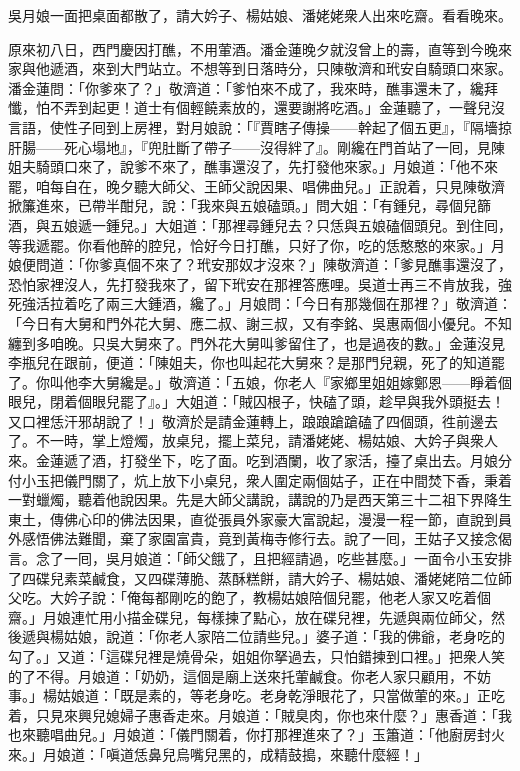 吳月娘一面把桌面都散了，請大妗子、楊姑娘、潘姥姥衆人出來吃齋。看看晚來。

原來初八日，西門慶因打醮，不用葷酒。潘金蓮晚夕就沒曾上的壽，直等到今晚來家與他遞酒，來到大門站立。不想等到日落時分，只陳敬濟和玳安自騎頭口來家。潘金蓮問：「你爹來了？」敬濟道：「爹怕來不成了，我來時，醮事還未了，纔拜懺，怕不弄到起更！道士有個輕饒素放的，還要謝將吃酒。」金蓮聽了，一聲兒沒言語，使性子囘到上房裡，對月娘說：「『賈瞎子傳操——幹起了個五更』，『隔墻掠肝腸——死心塌地』，『兜肚斷了帶子——沒得絆了』。{}剛纔在門首站了一囘，見陳姐夫騎頭口來了，說爹不來了，醮事還沒了，先打發他來家。」月娘道：「他不來罷，咱每自在，晚夕聽大師父、王師父說因果、唱佛曲兒。」{}正說着，只見陳敬濟掀簾進來，已帶半酣兒，說：「我來與五娘磕頭。」問大姐：「有鍾兒，尋個兒篩酒，與五娘遞一鍾兒。」大姐道：「那裡尋鍾兒去？只恁與五娘磕個頭兒。到住囘，等我遞罷。你看他醉的腔兒，恰好今日打醮，只好了你，吃的恁憨憨的來家。」月娘便問道：「你爹真個不來了？玳安那奴才沒來？」陳敬濟道：「爹見醮事還沒了，恐怕家裡沒人，先打發我來了，留下玳安在那裡答應哩。吳道士再三不肯放我，強死強活拉着吃了兩三大鍾酒，{}纔了。」月娘問：「今日有那幾個在那裡？」敬濟道：「今日有大舅和門外花大舅、應二叔、謝三叔，又有李銘、吳惠兩個小優兒。不知纏到多咱晚。只吳大舅來了。門外花大舅叫爹留住了，也是過夜的數。」金蓮沒見李瓶兒在跟前，便道：「陳姐夫，你也叫起花大舅來？是那門兒親，死了的知道罷了。你叫他李大舅纔是。」{}敬濟道：「五娘，你老人『家鄉里姐姐嫁鄭恩——睜着個眼兒，閉着個眼兒罷了』。」大姐道：「賊囚根子，快磕了頭，趁早與我外頭挺去！{}又口裡恁汗邪胡說了！」敬濟於是請金蓮轉上，踉踉蹌蹌磕了四個頭，{}徃前邊去了。不一時，掌上燈燭，放桌兒，擺上菜兒，請潘姥姥、楊姑娘、大妗子與衆人來。金蓮遞了酒，打發坐下，吃了面。吃到酒闌，收了家活，擡了桌出去。月娘分付小玉把儀門關了，炕上放下小桌兒，衆人圍定兩個姑子，正在中間焚下香，秉着一對蠟燭，聽着他說因果。先是大師父講說，講說的乃是西天第三十二祖下界降生東土，傳佛心印的佛法因果，直從張員外家豪大富說起，漫漫一程一節，直說到員外感悟佛法難聞，棄了家園富貴，竟到黃梅寺修行去。說了一囘，王姑子又接念偈言。念了一囘，吳月娘道：「師父餓了，且把經請過，吃些甚麼。」一面令小玉安排了四碟兒素菜鹹食，又四碟薄脆、蒸酥糕餅，請大妗子、楊姑娘、潘姥姥陪二位師父吃。大妗子說：「俺每都剛吃的飽了，教楊姑娘陪個兒罷，他老人家又吃着個齋。」月娘連忙用小描金碟兒，每樣揀了點心，放在碟兒裡，先遞與兩位師父，然後遞與楊姑娘，說道：「你老人家陪二位請些兒。」婆子道：「我的佛爺，老身吃的勾了。」又道：「這碟兒裡是燒骨朵，姐姐你拏過去，只怕錯揀到口裡。」把衆人笑的了不得。月娘道：「奶奶，這個是廟上送來托葷鹹食。你老人家只顧用，不妨事。」楊姑娘道：「既是素的，等老身吃。老身乾淨眼花了，只當做葷的來。」正吃着，只見來興兒媳婦子惠香走來。月娘道：「賊臭肉，你也來什麼？」惠香道：「我也來聽唱曲兒。」月娘道：「儀門關着，你打那裡進來了？」玉簫道：「他廚房封火來。」月娘道：「嗔道恁鼻兒烏嘴兒黑的，成精鼓搗，來聽什麼經！」{}


